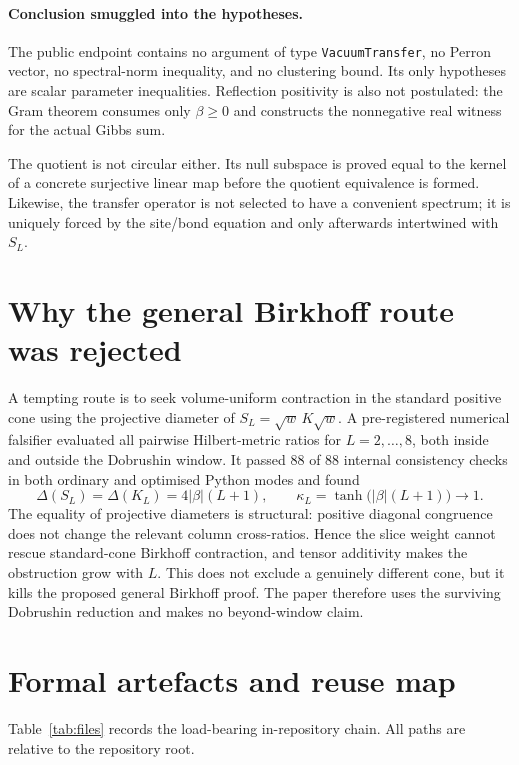 \documentclass[11pt]{article}
\begin{document}
\paragraph{Conclusion smuggled into the hypotheses.}
The public endpoint contains no argument of type \texttt{VacuumTransfer}, no
Perron vector, no spectral-norm inequality, and no clustering bound.  Its
only hypotheses are scalar parameter inequalities.  Reflection positivity is
also not postulated: the Gram theorem consumes only $\beta\ge0$ and constructs
the nonnegative real witness for the actual Gibbs sum.

The quotient is not circular either.  Its null subspace is proved equal to
the kernel of a concrete surjective linear map before the quotient
equivalence is formed.  Likewise, the transfer operator is not selected to
have a convenient spectrum; it is uniquely forced by the site/bond equation
and only afterwards intertwined with $S_L$.

\section{Why the general Birkhoff route was rejected}

A tempting route is to seek volume-uniform contraction in the standard
positive cone using the projective diameter of
$S_L=\sqrt w\,K\sqrt w$.  A pre-registered numerical falsifier evaluated
all pairwise Hilbert-metric ratios for $L=2,\ldots,8$, both inside and outside
the Dobrushin window.  It passed 88 of 88 internal consistency checks in both
ordinary and optimised Python modes and found
\[
 \Delta(S_L)=\Delta(K_L)=4|\beta|(L+1),
 \qquad
 \kappa_L=\tanh\!\bigl(|\beta|(L+1)\bigr)\longrightarrow1.
\]
The equality of projective diameters is structural: positive diagonal
congruence does not change the relevant column cross-ratios.  Hence the slice
weight cannot rescue standard-cone Birkhoff contraction, and tensor
additivity makes the obstruction grow with $L$.  This does not exclude a
genuinely different cone, but it kills the proposed general Birkhoff proof.
The paper therefore uses the surviving Dobrushin reduction and makes no
beyond-window claim.

\section{Formal artefacts and reuse map}

Table~\ref{tab:files} records the load-bearing in-repository chain.  All paths
are relative to the repository root.
\end{document}
